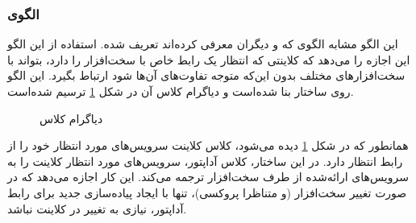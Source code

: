 \subsubsection{الگوی }
\label{HWAdapterSec}
\begin{RTL}
این الگو مشابه الگوی  که  و دیگران
\cite{ref3} معرفی کرده‌اند تعریف شده. استفاده از این الگو این اجازه را
می‌دهد که کلاینتی که انتظار یک رابط خاص با سخت‌افزار را دارد، بتواند با
سخت‌افزارهای مختلف بدون این‌که متوجه تفاوت‌های آن‌ها شود ارتباط بگیرد.
این الگو روی ساختار  بنا شده‌است و
دیاگرام کلاس آن در شکل \ref{HWAdapterClassDiag} ترسیم شده‌است.
\end{RTL}
\begin{figure}[h!]
\centering
{}
\caption{دیاگرام کلاس }
\label{HWAdapterClassDiag}
\end{figure}
\begin{RTL}
همانطور که در شکل \ref{HWAdapterClassDiag} دیده می‌شود،
کلاس کلاینت سرویس‌های مورد انتظار خود را از رابط
 انتظار دارد.
در این ساختار، کلاس آداپتور، سرویس‌های مورد انتظار کلاینت را به سرویس‌های ارائه‌شده
از طرف سخت‌افزار ترجمه می‌کند. این کار اجازه می‌دهد که در صورت تغییر سخت‌افزار
(و متناظرا پروکسی)، تنها با ایجاد پیاده‌سازی جدید برای رابط آداپتور، نیازی به تغییر
در کلاینت نباشد.
\end{RTL}